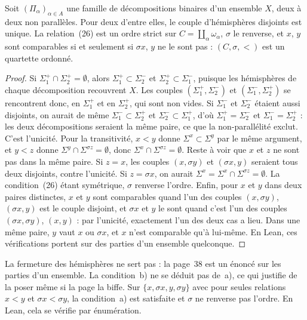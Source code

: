 \begin{enonce}
Soit $(\Pi_\alpha)_{\alpha \in A}$ une famille de décompositions binaires d'un ensemble $X$, deux à deux non parallèles. Pour deux d'entre elles, le couple d'hémisphères disjoints est unique. La relation~(26) est un ordre strict sur $C = \coprod_\alpha \omega_\alpha$, $\sigma$ le renverse, et $x$, $y$ sont comparables si et seulement si $\sigma x$, $y$ ne le sont pas : $(C, \sigma, <)$ est un quartette ordonné.
\end{enonce}

\begin{proof}
Si $\Sigma_1^+ \cap \Sigma_2^+ = \emptyset$, alors $\Sigma_1^+ \subset \Sigma_2^-$ et $\Sigma_2^+ \subset \Sigma_1^-$, puisque les hémisphères de chaque décomposition recouvrent $X$. Les couples $(\Sigma_1^+, \Sigma_2^-)$ et $(\Sigma_1^-, \Sigma_2^+)$ se rencontrent donc, en $\Sigma_1^+$ et en $\Sigma_2^+$, qui sont non vides. Si $\Sigma_1^-$ et $\Sigma_2^-$ étaient aussi disjoints, on aurait de même $\Sigma_1^- \subset \Sigma_2^+$ et $\Sigma_2^- \subset \Sigma_1^+$, d'où $\Sigma_1^+ = \Sigma_2^-$ et $\Sigma_1^- = \Sigma_2^+$ : les deux décompositions seraient la même paire, ce que la non-parallélité exclut. C'est l'unicité. Pour la transitivité, $x < y$ donne $\Sigma^x \subset \Sigma^y$ par le même argument, et $y < z$ donne $\Sigma^y \cap \Sigma^{\sigma z} = \emptyset$, donc $\Sigma^x \cap \Sigma^{\sigma z} = \emptyset$. Reste à voir que $x$ et $z$ ne sont pas dans la même paire. Si $z = x$, les couples $(x, \sigma y)$ et $(\sigma x, y)$ seraient tous deux disjoints, contre l'unicité. Si $z = \sigma x$, on aurait $\Sigma^x = \Sigma^x \cap \Sigma^{\sigma z} = \emptyset$. La condition~(26) étant symétrique, $\sigma$ renverse l'ordre. Enfin, pour $x$ et $y$ dans deux paires distinctes, $x$ et $y$ sont comparables quand l'un des couples $(x, \sigma y)$, $(\sigma x, y)$ est le couple disjoint, et $\sigma x$ et $y$ le sont quand c'est l'un des couples $(\sigma x, \sigma y)$, $(x, y)$ : par l'unicité, exactement l'un des deux cas a lieu. Dans une même paire, $y$ vaut $x$ ou $\sigma x$, et $x$ n'est comparable qu'à lui-même. En Lean, ces vérifications portent sur des parties d'un ensemble quelconque.
\end{proof}

\begin{remarque}
La fermeture des hémisphères ne sert pas : la page~38 est un énoncé sur les parties d'un ensemble. La condition~b) ne se déduit pas de~a), ce qui justifie de la poser même si la page la biffe. Sur $\{x, \sigma x, y, \sigma y\}$ avec pour seules relations $x < y$ et $\sigma x < \sigma y$, la condition~a) est satisfaite et $\sigma$ ne renverse pas l'ordre. En Lean, cela se vérifie par énumération.
\end{remarque}

